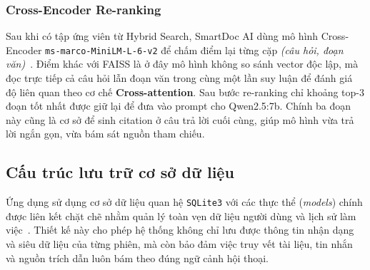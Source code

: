 \documentclass[10pt, conference, a4paper, compsocconf]{IEEEtran}
\newcommand{\smartdoc}{SmartDoc AI}
\begin{document}
\subsubsection{Cross-Encoder Re-ranking}
Sau khi có tập ứng viên từ Hybrid Search, \smartdoc{} dùng mô hình Cross-Encoder \texttt{ms-marco-MiniLM-L-6-v2} để chấm điểm lại từng cặp \textit{(câu hỏi, đoạn văn)}~\cite{retrieve-rerank,cross-encoder-model,smartdoc-source}. Điểm khác với FAISS là ở đây mô hình không so sánh vector độc lập, mà đọc trực tiếp cả câu hỏi lẫn đoạn văn trong cùng một lần suy luận để đánh giá độ liên quan theo cơ chế \textbf{Cross-attention}. Sau bước re-ranking chỉ khoảng top-3 đoạn tốt nhất được giữ lại để đưa vào prompt cho Qwen2.5:7b. Chính ba đoạn này cũng là cơ sở để sinh citation ở câu trả lời cuối cùng, giúp mô hình vừa trả lời ngắn gọn, vừa bám sát nguồn tham chiếu.

\subsection{Cấu trúc lưu trữ cơ sở dữ liệu}

Ứng dụng sử dụng cơ sở dữ liệu quan hệ \texttt{SQLite3} với các thực thể (\textit{models}) chính được liên kết chặt chẽ nhằm quản lý toàn vẹn dữ liệu người dùng và lịch sử làm việc~\cite{smartdoc-source}. Thiết kế này cho phép hệ thống không chỉ lưu được thông tin nhận dạng và siêu dữ liệu của từng phiên, mà còn bảo đảm việc truy vết tài liệu, tin nhắn và nguồn trích dẫn luôn bám theo đúng ngữ cảnh hội thoại.
\end{document}
